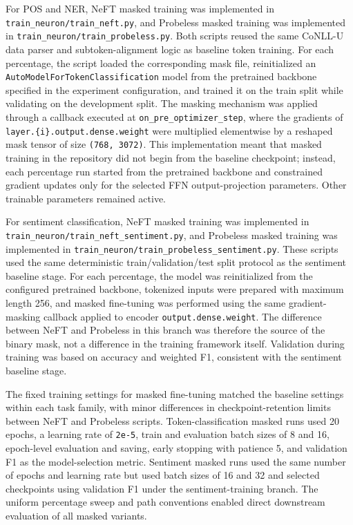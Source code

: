 \documentclass[12pt]{article}
\begin{document}
For POS and NER, NeFT masked training was implemented in \texttt{train\_neuron/train\_neft.py}, and Probeless masked training was implemented in \texttt{train\_neuron/train\_probeless.py}. Both scripts reused the same CoNLL-U data parser and subtoken-alignment logic as baseline token training. For each percentage, the script loaded the corresponding mask file, reinitialized an \texttt{AutoModelForTokenClassification} model from the pretrained backbone specified in the experiment configuration, and trained it on the train split while validating on the development split. The masking mechanism was applied through a callback executed at \texttt{on\_pre\_optimizer\_step}, where the gradients of \texttt{layer.\{i\}.output.dense.weight} were multiplied elementwise by a reshaped mask tensor of size \texttt{(768, 3072)}. This implementation meant that masked training in the repository did not begin from the baseline checkpoint; instead, each percentage run started from the pretrained backbone and constrained gradient updates only for the selected FFN output-projection parameters. Other trainable parameters remained active.

For sentiment classification, NeFT masked training was implemented in \texttt{train\_neuron/train\_neft\_sentiment.py}, and Probeless masked training was implemented in \texttt{train\_neuron/train\_probeless\_sentiment.py}. These scripts used the same deterministic train/validation/test split protocol as the sentiment baseline stage. For each percentage, the model was reinitialized from the configured pretrained backbone, tokenized inputs were prepared with maximum length 256, and masked fine-tuning was performed using the same gradient-masking callback applied to encoder \texttt{output.dense.weight}. The difference between NeFT and Probeless in this branch was therefore the source of the binary mask, not a difference in the training framework itself. Validation during training was based on accuracy and weighted F1, consistent with the sentiment baseline stage.

The fixed training settings for masked fine-tuning matched the baseline settings within each task family, with minor differences in checkpoint-retention limits between NeFT and Probeless scripts. Token-classification masked runs used 20 epochs, a learning rate of \texttt{2e-5}, train and evaluation batch sizes of 8 and 16, epoch-level evaluation and saving, early stopping with patience 5, and validation F1 as the model-selection metric. Sentiment masked runs used the same number of epochs and learning rate but used batch sizes of 16 and 32 and selected checkpoints using validation F1 under the sentiment-training branch. The uniform percentage sweep and path conventions enabled direct downstream evaluation of all masked variants.
\end{document}
